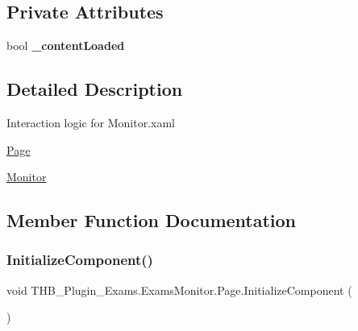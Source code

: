 \subsection*{Private Attributes}
\begin{DoxyCompactItemize}
\item 
\mbox{\label{class_t_h_b___plugin___exams_1_1_exams_monitor_1_1_page_a0426f659cf9405b6663f488af616c2ef}} 
bool {\bfseries \+\_\+content\+Loaded}
\end{DoxyCompactItemize}


\subsection{Detailed Description}
Interaction logic for Monitor.\+xaml 

\mbox{\hyperlink{class_t_h_b___plugin___exams_1_1_exams_monitor_1_1_page}{Page}} 

\mbox{\hyperlink{class_t_h_b___plugin___exams_1_1_monitor}{Monitor}} 

\subsection{Member Function Documentation}
\mbox{\label{class_t_h_b___plugin___exams_1_1_exams_monitor_1_1_page_ab0fefb3d9540c12aa45fb516ba4355b3}} 
\subsubsection{\texorpdfstring{Initialize\+Component()}{InitializeComponent()}\hspace{0.1cm}{\footnotesize\ttfamily [1/6]}}
{\footnotesize\ttfamily void T\+H\+B\+\_\+\+Plugin\+\_\+\+Exams.\+Exams\+Monitor.\+Page.\+Initialize\+Component (\begin{DoxyParamCaption}{ }\end{DoxyParamCaption})}



